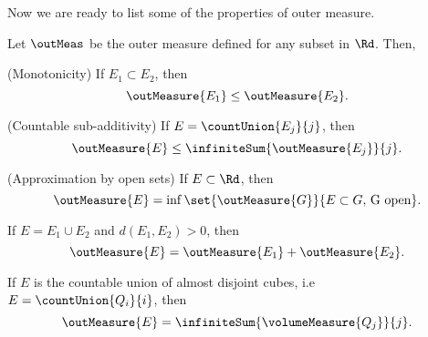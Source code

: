 Now we are ready to list some of the properties of outer measure.
\begin{Proposition}[name=Properties of (volume) outer measure]\label{prop:out_meas_rn_prop}
    Let $\outMeas$ be the outer measure defined for any subset in $\Rd$. Then,
    \begin{properties}
    \item
	(Monotonicity) If $E_1 \subset E_2$, then 
	\[\outMeasure{E_1} \leq \outMeasure{E_2}.\] 
    \item
	(Countable sub-additivity) If $E = \countUnion{E_j}{j}$, then
	\[\outMeasure{E} \leq \infiniteSum{\outMeasure{E_j}}{j}.\]
    \item
	(Approximation by open sets) If $E \subset \Rd$, then
	\[\outMeasure{E} = \inf\set{\outMeasure{G}}{E\subset G,\,\text{G open}}.\]
    \item
	If $E = E_1\cup E_2$ and $d(E_1,E_2) > 0$, then
	\[\outMeasure{E} = \outMeasure{E_1} + \outMeasure{E_2}.\]
    \item
	If $E$ is the countable union of almost disjoint cubes, i.e~$E = \countUnion{Q_i}{i}$, then
	\[\outMeasure{E} = \infiniteSum{\volumeMeasure{Q_j}}{j}.\] 
    \end{properties}
	
\end{Proposition}
